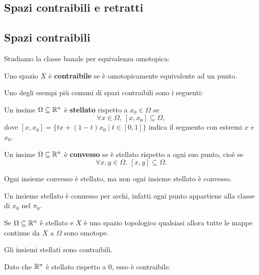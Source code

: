 \begin{multicols*}{2}
\section{Spazi contraibili e retratti}
\subsection{Spazi contraibili}
Studiamo la classe banale per equivalenza omotopica:
\begin{definition}
Uno spazio $X$ è \textbf{contraibile} se è omotopicamente equivalente ad un punto.
\end{definition}

\noindent Uno degli esempi più comuni di spazi contraibili sono i seguenti:
\begin{definition}
Un insime $\Omega\subseteq \mathbb{R}^n$ è \textbf{stellato} rispetto a $x_0\in \Omega$ se
\[\forall x\in\Omega,\ [x,x_0]\subseteq \Omega,\]
dove $[x,x_0]=\{tx+(1-t)x_0\mid t\in[0,1]\}$ indica il segmento con estremi $x$ e $x_0$.
\end{definition}
\begin{definition}
Un insime $\Omega\subseteq \mathbb{R}^n$ è \textbf{convesso} se è stellato rispetto a ogni suo punto, cioè se
\[\forall x,y\in \Omega,\ [x,y]\subseteq \Omega.\]
\end{definition}
\begin{remark}
Ogni insieme convesso è stellato, ma non ogni insieme stellato è convesso.
\end{remark}
\begin{remark}
Un insieme stellato è connesso per archi, infatti ogni punto appartiene alla classe di $x_0$ nel $\pi_0$.
\end{remark}

\begin{proposition}\label{MappeAImmagineInStellato}
Se $\Omega\subseteq \mathbb{R}^n$ è stellato e $X$ è uno spazio topologico qualsiasi allora tutte le mappe continue da $X$ a $\Omega$ sono omotope.
\end{proposition}
\begin{corollary}\label{StellatiSOnoContraibili}
Gli insiemi stellati sono contraibili.
\end{corollary}

\begin{remark}
Dato che $\mathbb{R}^n$ è stellato rispetto a $0$, esso è contraibile.
\end{remark}


\end{multicols*}
